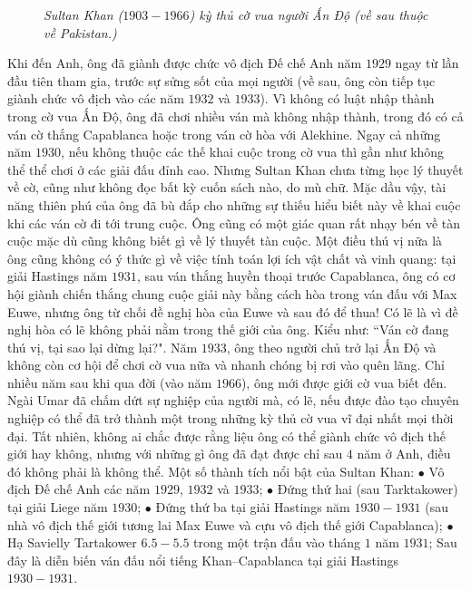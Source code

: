 \begin{multicols}{2}
\begin{figure}[H]
		\caption{\small\textit{\color{gocco}Sultan Khan ($1903-1966$) kỳ thủ cờ vua người Ấn Độ (về sau thuộc về Pakistan.)}}
		\vspace*{-10pt}
	\end{figure}
	Khi đến Anh, ông đã giành được chức vô địch Đế chế Anh năm $1929$ ngay từ lần đầu tiên tham gia, trước sự sửng sốt của mọi người (về sau, ông còn tiếp tục giành chức vô địch vào các năm $1932$ và $1933$). Vì không có luật nhập thành trong cờ vua Ấn Độ, ông đã chơi nhiều ván mà không nhập thành, trong đó có cả ván cờ thắng Capablanca hoặc trong ván cờ hòa với Alekhine. Ngay cả những năm $1930$, nếu không thuộc các thế khai cuộc trong cờ vua thì gần như không thể thể chơi ở các giải đấu đỉnh cao. Nhưng Sultan Khan chưa từng học lý thuyết về cờ, cũng như không đọc bất kỳ cuốn sách nào, do mù chữ. Mặc dầu vậy, tài năng thiên phú của ông đã bù đắp cho những sự thiếu hiểu biết này về khai cuộc khi các ván cờ đi tới trung cuộc. Ông cũng có một giác quan rất nhạy bén về tàn cuộc mặc dù cũng không biết gì về lý thuyết tàn cuộc. Một điều thú vị nữa là ông cũng không có ý thức gì về việc tính toán lợi ích vật chất và vinh quang: tại giải Hastings năm $1931$, sau ván thắng huyền thoại trước Capablanca, ông có cơ hội giành chiến thắng chung cuộc giải này bằng cách hòa trong ván đấu với Max Euwe, nhưng ông từ chối đề nghị hòa của Euwe và sau đó để thua! Có lẽ là vì đề nghị hòa có lẽ không phải nằm trong thế giới của ông. Kiểu như: ``Ván cờ đang thú vị, tại sao lại dừng lại?".
	\vskip 0.1cm
	Năm $1933$, ông theo người chủ trở lại Ấn Độ và không còn cơ hội để chơi cờ vua nữa và nhanh chóng bị rơi vào quên lãng. Chỉ nhiều năm sau khi qua đời (vào năm $1966$), ông mới được giới cờ vua biết đến. Ngài Umar đã chấm dứt sự nghiệp của người mà, có lẽ, nếu được đào tạo chuyên nghiệp có thể đã trở thành một trong những kỳ thủ cờ vua vĩ đại nhất mọi thời đại. Tất nhiên, không ai chắc được rằng liệu ông có thể giành chức vô địch thế giới hay không, nhưng với những gì ông đã đạt được chỉ sau $4$ năm ở Anh, điều đó không phải là không thể. 
	\vskip 0.1cm
	Một số thành tích nổi bật của Sultan Khan:  
	\vskip 0.1cm
	$\bullet$	Vô địch Đế chế Anh các năm $1929$, $1932$ và $1933$;
	\vskip 0.1cm 
	$\bullet$	Đứng thứ hai (sau Tarktakower) tại giải Liege năm $1930$;
	\vskip 0.1cm 
	$\bullet$	Đứng thứ ba tại giải Hastings năm $1930-1931$ (sau nhà vô địch thế giới tương lai Max Euwe và cựu vô địch thế giới Capablanca);
	\vskip 0.1cm
	$\bullet$	Hạ Savielly Tartakower $6{.}5-5{.}5$ trong một trận đấu vào tháng $1$ năm $1931$;
	\vskip 0.1cm
	Sau đây là diễn biến ván đấu nổi tiếng Khan--Capablanca tại giải Hastings $1930-1931$.

\end{multicols}
